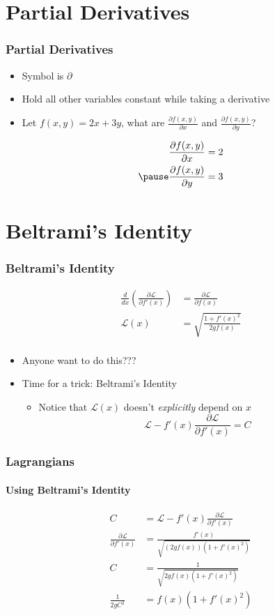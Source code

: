 \documentclass[12pt]{beamer}
\begin{document}
\section{Partial Derivatives}
\begin{frame}
\frametitle{Partial Derivatives}
\begin{itemize}
    \item Symbol is $\partial$
    \pause
    \item Hold all other variables constant while taking a derivative
    \pause
    \item Let $f(x,y) = 2x+3y$, what are $\frac{\partial f(x,y)}{\partial x}$ and $\frac{\partial f(x,y)}{\partial y}$?
    \pause
\end{itemize}
\begin{align*}
\frac{\partial f(x,y)}{\partial x} &= 2 \\
\pause
\frac{\partial f(x,y)}{\partial y} &= 3 \\
\end{align*}
\end{frame}

\section{Beltrami's Identity}
\begin{frame}
\frametitle{Beltrami's Identity}
\begin{align*}
\frac{d}{dx} \left ( \frac{\partial \mathcal{L} }{\partial f'(x) } \right ) &= \frac{\partial \mathcal{L}}{\partial f(x)} \\
\mathcal{L}(x) &= \sqrt{\frac{1 + f'(x)^2}{2gf(x)}} \\
\end{align*}
\begin{itemize}
    \pause
    \item Anyone want to do this???
    \pause
    \item Time for a trick: Beltrami's Identity
    \begin{itemize}
        \item Notice that $\mathcal{L}(x)$ doesn't \textit{explicitly} depend on $x$
        $$
        \mathcal{L} - f'(x) \frac{\partial \mathcal{L}}{\partial f'(x)} = C
        $$
    \end{itemize}
\end{itemize}
\end{frame}

\begin{frame}
\frametitle{Lagrangians}
\framesubtitle{Using Beltrami's Identity}
\begin{align*}
    C &= \mathcal{L} - f'(x) \frac{\partial \mathcal{L}}{\partial f'(x)} \\
    \frac{\partial \mathcal{L}}{\partial f'(x)} &= \frac{f'(x)}{\sqrt{\left (2g f(x)  \right) \left (1 + f'(x)^2 \right)}} \\
    C &= \frac{1}{\sqrt{2gf(x) \left (1 + f'(x)^2 \right)}} \\
    \frac{1}{2gC^2} &= f(x) \left (1 + f'(x)^2 \right ) \\
\end{align*}
\end{frame}
\end{document}
